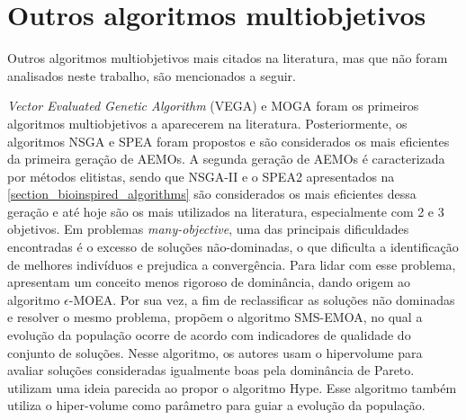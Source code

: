 \section{Outros algoritmos multiobjetivos}
Outros algoritmos multiobjetivos mais citados na literatura, mas que não foram analisados neste trabalho, são mencionados a seguir.

\textit{Vector Evaluated Genetic Algorithm} (VEGA) \cite{Schaffer1985} e \ac{MOGA} \cite{MOGA} foram os primeiros algoritmos multiobjetivos a aparecerem na literatura. Posteriormente, os algoritmos \ac{NSGA} \cite{Srinivas1994} e \ac{SPEA} \cite{Zitzler1999} foram propostos e são considerados os mais eficientes da primeira geração de \acp{AEMO}. A segunda geração de \acp{AEMO} é caracterizada por métodos elitistas, sendo que NSGA-II e o SPEA2 apresentados na \ref{section_bioinspired_algorithms} são considerados os mais eficientes dessa geração e até hoje são os mais utilizados na literatura, especialmente com 2 e 3 objetivos. Em problemas \textit{many-objective}, uma das principais dificuldades encontradas é o excesso de soluções não-dominadas, o que dificulta a identificação de melhores indivíduos e prejudica a convergência. Para lidar com esse problema, \cite{Aguirre2009} apresentam um conceito menos rigoroso de dominância, dando origem ao algoritmo $\epsilon$-MOEA. Por sua vez, a fim de reclassificar as soluções não dominadas e resolver o mesmo problema, \cite{Beume2007} propõem o algoritmo SMS-EMOA, no qual a evolução da população ocorre de acordo com indicadores de qualidade do conjunto de soluções. Nesse algoritmo, os autores usam o hipervolume para avaliar soluções consideradas igualmente boas pela dominância de Pareto. \cite{Bader2011} utilizam uma ideia parecida ao propor o algoritmo Hype. Esse algoritmo também utiliza o hiper-volume como parâmetro para guiar a evolução da população. 


